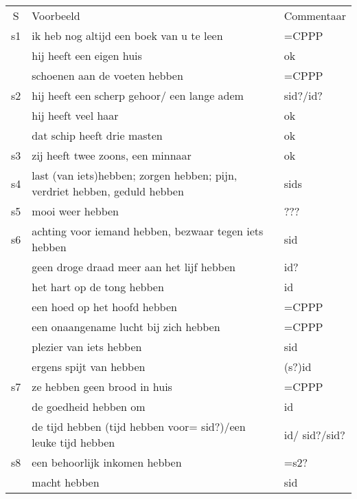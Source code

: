 \begin{tabular}[t]{|c|p{}|p{}|}
\hline
S  &  Voorbeeld                                              & Commentaar\\
s1 &  ik heb nog altijd een boek van u te leen               & =CPPP\\
   &  hij heeft een eigen huis                               & ok\\
   &  schoenen aan de voeten hebben                          & =CPPP\\
s2 &  hij heeft een scherp gehoor/ een lange adem            & sid?/id?\\
   &  hij heeft veel haar                                    &  ok\\
   &  dat schip heeft drie masten                            & ok\\
s3 &  zij heeft twee zoons, een minnaar                      & ok\\
s4 &  last (van iets)hebben; zorgen hebben; pijn, verdriet
      hebben, geduld hebben                                  & sids\\
s5 & mooi weer hebben                                        & ???\\
s6 & achting voor iemand hebben, bezwaar tegen iets hebben   & sid\\
   & geen droge draad meer aan het lijf hebben               & id?\\
   & het hart op de tong hebben                              & id\\
   & een hoed op het hoofd hebben                            & =CPPP\\
   & een onaangename lucht bij zich hebben                   & =CPPP\\
   & plezier van iets hebben                                 & sid\\
   & ergens spijt van hebben                                 & (s?)id\\
s7 & ze hebben geen brood in huis                            & =CPPP\\
   & de goedheid hebben om                                   & id\\
   & de tijd hebben (tijd hebben voor= sid?)/een leuke tijd
     hebben                                                  & id/ sid?/sid?\\
s8 & een behoorlijk inkomen hebben                           & =s2?\\
   & macht hebben                                            & sid\\

\end{tabular}
